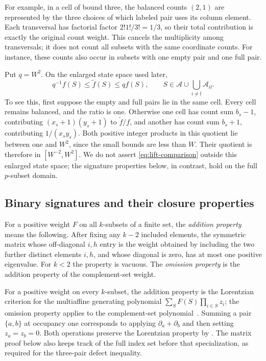 For example, in a cell of bound three, the balanced counts $(2,1)$
are represented by the three choices of which labeled pair uses its
column element.  Each transversal has factorial factor
$2!1!/3!=1/3$, so their total contribution is exactly the original
count weight.  This cancels the multiplicity among transversals; it does not count
all subsets with the same coordinate counts.  For instance, these
counts also occur in subsets with one empty pair and one full pair.

Put \(q=W^2\).
On the enlarged state space used later,
\begin{equation}
 q^{-1}f(S)\le\widetilde f(S)\le qf(S),
 \qquad
 S\in\mathcal A\cup\bigcup_{i\ne l}\mathcal A_{il}.
 \label{eq:lift-comparison}
\end{equation}
To see this, first suppose the empty and full pairs lie in the
same cell.  Every cell remains balanced, and the ratio is one.
Otherwise one cell has count sum \(b_s-1\), contributing
\((x_s+1)(y_s+1)\) to \(\widetilde f/f\), and another has count
sum \(b_s+1\), contributing \(1/(x_sy_s)\).
Both positive integer products in this quotient lie between one
and \(W^2\), since the small bounds are less than \(W\).
Their quotient is therefore in \([W^{-2},W^2]\).
We do not assert \eqref{eq:lift-comparison} outside this enlarged
state space; the signature properties below, in contrast, hold
on the full \(p\)-subset domain.

\subsection{Binary signatures and their closure properties}

For a positive weight \(F\) on all \(k\)-subsets of a finite set,
the \emph{addition property} means the following.
After fixing any \(k-2\) included elements, the symmetric matrix
whose off-diagonal \(i,h\) entry is the weight obtained by including
the two further distinct elements \(i,h\), and whose diagonal is
zero, has at most one positive eigenvalue.
For \(k<2\) the property is vacuous.
The \emph{omission property} is the addition property of the
complement-set weight.

For a positive weight on every $k$-subset, the addition property is
the Lorentzian criterion for the multiaffine generating polynomial
$\sum_S F(S)\prod_{i\in S}z_i$; the omission property applies to the
complement-set polynomial~\cite[Theorem~2.25]{BH2020}.
Summing a pair $\{a,b\}$ at occupancy one corresponds to applying
$\partial_a+\partial_b$ and then setting $z_a=z_b=0$.
Both operations preserve the Lorentzian property by
\cite[Theorem~2.10 and Corollary~2.11]{BH2020}.
The matrix proof below also keeps track of the full index set before
that specialization, as required for the three-pair defect inequality.

